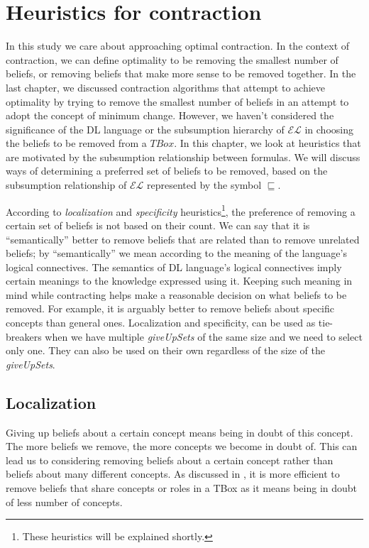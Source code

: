 \chapter{Heuristics for contraction}
In this study we care about approaching optimal contraction. In the context of contraction, we can define optimality to be removing the smallest number of beliefs, or removing beliefs that make more sense to be removed together. In the last chapter, we discussed contraction algorithms that attempt to achieve optimality by trying to remove the smallest number of beliefs in an attempt to adopt the concept of minimum change. However, we haven't considered the significance of the DL language or the subsumption hierarchy of $\mathcal{EL}$ in choosing the beliefs to be removed from a $TBox$. In this chapter, we look at heuristics that are motivated by the subsumption relationship between formulas. We will discuss ways of determining a preferred set of beliefs to be removed, based on the subsumption relationship of $\mathcal{EL}$ represented by the symbol $\sqsubseteq$. 

According to \textit{localization} and \textit{specificity} heuristics\footnote{These heuristics will be explained shortly.}, the preference of removing a certain set of beliefs is not based on their count. We can say that it is ``semantically'' better to remove beliefs that are related than to remove unrelated beliefs; by ``semantically'' we mean according to the meaning of the language's logical connectives. The semantics of DL language's logical connectives imply certain meanings to the knowledge expressed using it. Keeping such meaning in mind while contracting helps make a reasonable decision on what beliefs to be removed. For example, it is arguably better to remove beliefs about specific concepts than general ones. Localization and specificity, can be used as tie-breakers when we have multiple \textit{giveUpSets} of the same size and we need to select only one. They can also be used on their own regardless of the size of the \textit{giveUpSets}.

\section{Localization}
Giving up beliefs about a certain concept means being in doubt of this concept. The more beliefs we remove, the more concepts we become in doubt of. This can lead us to considering removing beliefs about a certain concept rather than beliefs about many different concepts. As discussed in \cite{zwei}, it is more efficient to remove beliefs that share concepts or roles in a TBox as it means being in doubt of less number of concepts.

